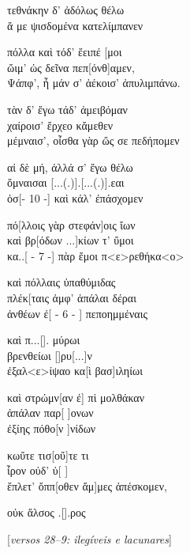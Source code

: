 \begin{gkverse}
τεθνάκην δ’ ἀδόλως θέλω\\
ἄ με ψισδομένα κατελίμπανεν

πόλλα καὶ τόδ’ ἔειπέ  [μοι\\
ὤιμ’ ὠς δεῖνα πεπ[όνθ]αμεν,\\
Ψάπφ’, ἦ μάν σ’ ἀέκοισ’ ἀπυλιμπάνω.

τὰν δ’ ἔγω τάδ’ ἀμειβόμαν\\
χαίροισ’ ἔρχεο κἄμεθεν\\
μέμναισ’, οἶσθα γὰρ ὤς σε πεδήπομεν

αἰ δὲ μή, ἀλλά σ’ ἔγω θέλω\\
ὄμναισαι [...(.)].[...(.)].εαι\\
ὀσ[\qquad     - 10 -\qquad   ] καὶ κάλ’ ἐπάσχομεν

πό[λλοις γὰρ στεφάν]οις ἴων\\
καὶ βρ[όδων ...]κίων τ’ ὔμοι\\
κα..[ - 7 -\quad   ] πὰρ ἔμοι π<ε>ρεθήκα<ο>

καὶ πόλλαις ὐπαθύμιδας\\
πλέκ[ταις ἀμφ’ ἀπάλαι δέραι\\
ἀνθέων ἐ[  -  6  -  ] πεποημμέναις

καὶ π...[\qquad      ]. μύρωι\\
βρενθείωι [\qquad      ]ρυ[...]ν\\
ἐξαλ<ε>ίψαο κα[ὶ βασ]ιληίωι

καὶ στρώμν[αν ἐ] πὶ μολθάκαν\\
ἀπάλαν παρ[ \quad   ]ονων\\ 
ἐξίης πόθο[ν \quad    ]νίδων

κωὔτε τισ[\quad       οὔ]τε τι\\
ἶρον οὐδ’ ὐ[ \quad        ]\\
ἔπλετ’ ὄππ[οθεν ἄμ]μες ἀπέσκομεν,

οὐκ ἄλσος .[\qquad	       ].ρος

\textnormal{[\emph{versos 28--9: ilegíveis e lacunares}]}
\end{gkverse}


